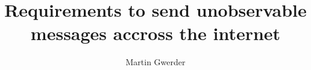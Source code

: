 \documentclass[12pt,journal,compsoc,peerreview]{IEEEtran}
\begin{document}
%
\title{Requirements to send unobservable messages accross the internet}
%
%
%
%

\ifCLASSOPTIONpeerreview
\author{}
\else
\author{Martin Gwerder%
}
\fi

% 
%
\end{document}
